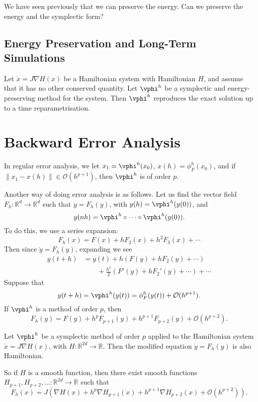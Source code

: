 \documentclass[12pt]{article}
\begin{document}
We have seen previously that we can preserve the energy. Can we preserve the energy and the symplectic form?

\subsection{Energy Preservation and Long-Term Simulations}%
\label{sub:eplts}

\begin{theorem}
	Let $\dot x = J \nabla H(x)$ be a Hamiltonian system with Hamiltonian $H$, and assume that it has no other conserved quantity. Let $\vphi^{h}$ be a symplectic and energy-preserving method for the system. Then $\vphi^{h}$ reproduces the exact solution up to a time reparametrisation.
\end{theorem}

\newpage

\section{Backward Error Analysis}%
\label{sec:bam}

In regular error analysis, we let $x_1 = \vphi^{h}(x_0)$, $x(h) = \phi_F^{h}(x_0)$, and if $\|x_1 - x(h)\| \in \mathcal{O}(h^{p+1})$, then $\vphi^{h}$ is of order $p$.

Another way of doing error analysis is as follows. Let us find the vector field $F_h : \mathbb{R}^{d} \to \mathbb{R}^{d}$ such that $\dot y = F_h(y)$, with $y(h) = \vphi^{h}(y(0))$, and
\[
y(n h) = \vphi^{h} \circ \cdots \circ \vphi^{h}(y(0)).
\]
To do this, we use a series expansion:
\[
F_h(x) = F(x) + h F_2(x) + h^2 F_3(x) + \cdots
\]
Then since $\dot y = F_h(y)$, expanding we see
\begin{align*}
	y(t + h) &= y(t) + h(F(y) + h F_2(y) + \cdots) \\
		 & \qquad + \frac{h^2}{2} (F'(y) + h F_2'(y) + \cdots) + \cdots
\end{align*}
Suppose that
\[
y(t + h) = \vphi^{h}(y(t)) = \phi_F^{h}(y(t)) + \mathcal{O}(h^{p+1}).
\]
If $\vphi^{h}$ is a method of order $p$, then
\[
F_h(y) = F(y) + h^{p} F_{p+1}(y) + h^{p+1} F_{p+2}(y) + \mathcal{O}(h^{p+2}).
\]
\begin{theorem}
	Let $\vphi^{h}$ be a symplectic method of order $p$ applied to the Hamiltonian system $\dot x = J \nabla H(x)$, with $H : \mathbb{R}^{2d} \to \mathbb{R}$. Then the modified equation $\dot y = F_h(y)$ is also Hamiltonian.

	So if $H$ is a smooth function, then there exist smooth functions $H_{p+1}, H_{p+2}, \ldots : \mathbb{R}^{2d} \to \mathbb{R}$ such that
	\[
	F_h(x) = J (\nabla H(x) + h^{p} \nabla H_{p+1}(x) + h^{p+1} \nabla H_{p+2}(x) + \mathcal{O}(h^{p+2})).
	\]
\end{theorem}
\end{document}
